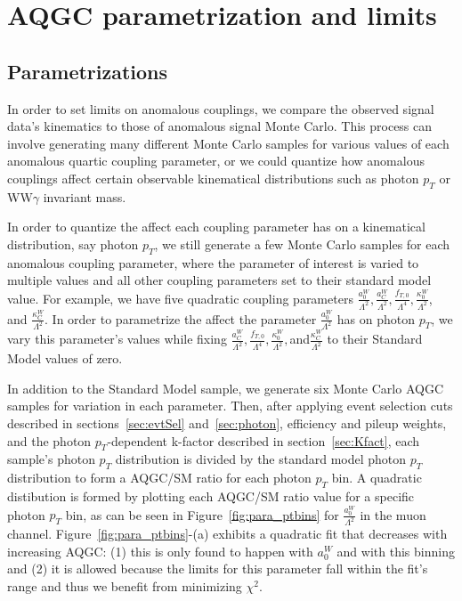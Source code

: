 \clearpage{}
\section{AQGC parametrization and limits}
\label{sec:aQGClim}

\subsection{Parametrizations}
In order to set limits on anomalous couplings, we compare the observed 
signal data's kinematics to those of anomalous signal Monte Carlo.  This 
process can involve generating many different Monte Carlo samples for 
various values of each anomalous quartic coupling parameter, or we could 
quantize how anomalous couplings affect certain observable kinematical 
distributions such as photon $p_{T}$ or WW$\gamma$ invariant mass.  

In order to quantize the affect each coupling parameter has on a kinematical
distribution, say photon $p_{T}$, we still generate a few Monte Carlo 
samples for each anomalous coupling parameter, where the parameter of 
interest is varied to multiple values and all other coupling parameters set 
to their standard model value.  For example, we have five quadratic coupling
parameters $\frac{a_{0}^{W}}{\Lambda^{2}}, \frac{a_{C}^{W}}{\Lambda^{2}}, 
\frac{f_{T,0}}{\Lambda^{4}}, \frac{\kappa_{0}^{W}}{\Lambda^{2}}$, and 
$\frac{\kappa_{C}^{W}}{\Lambda^{2}}$.  In 
order to parametrize the affect the parameter 
$\frac{a_{0}^{W}}{\Lambda^{2}}$ has on photon $p_{T}$, we vary this 
parameter's values while fixing $\frac{a_{C}^{W}}{\Lambda^{2}}, 
\frac{f_{T,0}}{\Lambda^{4}}, \frac{\kappa_{0}^{W}}{\Lambda^{2}}, $and$ 
\frac{\kappa_{C}^{W}}{\Lambda^{2}}$ to their
Standard Model values of zero.

In addition to the Standard Model sample, we generate six Monte Carlo AQGC 
samples for variation in each parameter.  Then, after applying event 
selection cuts described in sections~\ref{sec:evtSel} and~\ref{sec:photon}, 
efficiency and pileup weights, and the photon $p_{T}$-dependent k-factor 
described in section~\ref{sec:Kfact}, each sample's photon $p_{T}$ 
distribution is divided by the standard model photon $p_{T}$ distribution to
form a AQGC/SM ratio for each photon $p_{T}$ bin. A quadratic distibution is
formed by plotting each AQGC/SM ratio value for a specific photon $p_{T}$ 
bin, as can be seen in Figure~\ref{fig:para_ptbins} for 
$\frac{a_{0}^{W}}{\Lambda^{2}}$ in the muon channel. 
Figure~\ref{fig:para_ptbins}-(a) exhibits a quadratic fit that decreases
with increasing AQGC: (1) this is only found to happen with $a_{0}^{W}$
and with this binning and (2) it is allowed because the limits for this
parameter fall within the fit's range and thus we benefit from minimizing
$\chi^{2}$.

